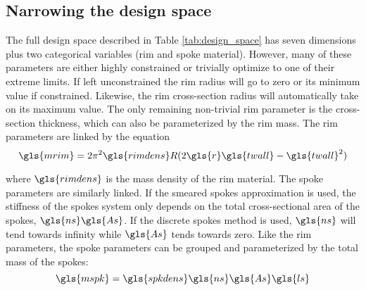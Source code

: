 \documentclass[\rootdir/thesis.tex]{subfiles}
\begin{document}
\subsection{Narrowing the design space}

The full design space described in Table \ref{tab:design_space} has seven dimensions plus two categorical variables (rim and spoke material). However, many of these parameters are either highly constrained or trivially optimize to one of their extreme limits. If left unconstrained the rim radius will go to zero or its minimum value if constrained. Likewise, the rim cross-section radius will automatically take on its maximum value. The only remaining non-trivial rim parameter is the cross-section thickness, which can also be parameterized by the rim mass. The rim parameters are linked by the equation
\begin{equation}
\label{eq:m_rim}
\gls{mrim} = 2\pi^2 \gls{rimdens} R (2\gls{r}\gls{twall} - \gls{twall}^2)
\end{equation}

where $\gls{rimdens}$ is the mass density of the rim material. The spoke parameters are similarly linked. If the smeared spokes approximation is used, the stiffness of the spokes system only depends on the total cross-sectional area of the spokes, $\gls{ns}\gls{As}$. If the discrete spokes method is used, $\gls{ns}$ will tend towards infinity while $\gls{As}$ tends towards zero. Like the rim parameters, the spoke parameters can be grouped and parameterized by the total mass of the spokes:
\begin{equation}
\label{eq:m_spokes}
\gls{mspk} = \gls{spkdens} \gls{ns} \gls{As} \gls{ls}
\end{equation}
\end{document}
